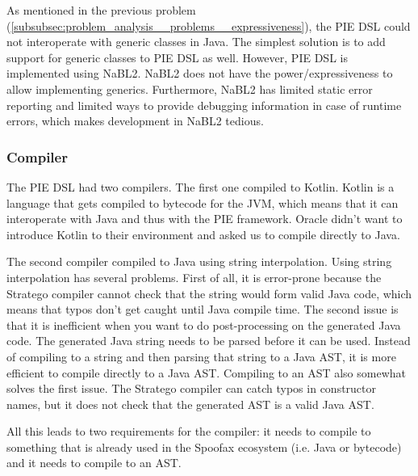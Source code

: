 As mentioned in the previous problem (\ref{subsubsec:problem_analysis__problems__expressiveness}), the \ac{PIE} \ac{DSL} could not interoperate with generic classes in Java.
The simplest solution is to add support for generic classes to \ac{PIE} \ac{DSL} as well.
However, \ac{PIE} \ac{DSL} is implemented using NaBL2.
NaBL2 does not have the power/expressiveness to allow implementing generics.
Furthermore, NaBL2 has limited static error reporting and limited ways to provide debugging information in case of runtime errors, which makes development in NaBL2 tedious.

\subsubsection{Compiler}
\label{subsubsec:problem_analysis__problems__compiler}

The \ac{PIE} \ac{DSL} had two compilers.
The first one compiled to Kotlin.
Kotlin is a language that gets compiled to bytecode for the JVM, which means that it can interoperate with Java and thus with the \ac{PIE} framework.
Oracle didn't want to introduce Kotlin to their environment and asked us to compile directly to Java.

The second compiler compiled to Java using string interpolation.
Using string interpolation has several problems.
First of all, it is error-prone because the Stratego compiler cannot check that the string would form valid Java code, which means that typos don't get caught until Java compile time.
The second issue is that it is inefficient when you want to do post-processing on the generated Java code.
The generated Java string needs to be parsed before it can be used.
Instead of compiling to a string and then parsing that string to a Java AST, it is more efficient to compile directly to a Java AST.
Compiling to an AST also somewhat solves the first issue.
The Stratego compiler can catch typos in constructor names, but it does not check that the generated AST is a valid Java AST.

All this leads to two requirements for the compiler: it needs to compile to something that is already used in the Spoofax ecosystem (i.e. Java or bytecode) and it needs to compile to an AST.

